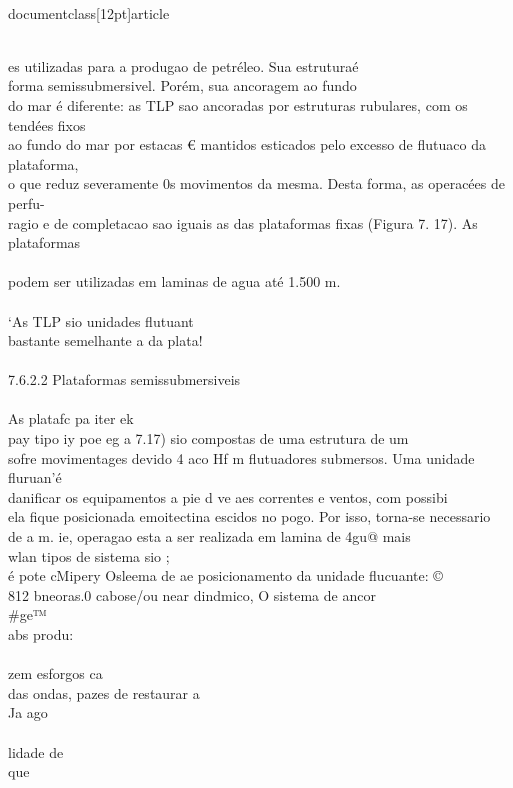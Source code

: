 \\documentclass[12pt]{article}
\begin{document}
\\
es utilizadas para a produgao de petréleo. Sua estruturaé\\
forma semissubmersivel. Porém, sua ancoragem ao fundo\\
do mar é diferente: as TLP sao ancoradas por estruturas rubulares, com os tendées fixos\\
ao fundo do mar por estacas € mantidos esticados pelo excesso de flutuaco da plataforma,\\
o que reduz severamente 0s movimentos da mesma. Desta forma, as operacées de perfu-\\
ragio e de completacao sao iguais as das plataformas fixas (Figura 7. 17). As plataformas\\
\\
podem ser utilizadas em laminas de agua até 1.500 m.\\
\\
‘As TLP sio unidades flutuant\\
bastante semelhante a da plata!\\
\\
7.6.2.2 Plataformas semissubmersiveis\\
\\
As platafc pa iter ek\\
pay tipo iy poe eg a 7.17) sio compostas de uma estrutura de um\\
sofre movimentages devido 4 aco Hf m flutuadores submersos. Uma unidade fluruan'é\\
danificar os equipamentos a pie d ve aes correntes e ventos, com possibi\\
ela fique posicionada emoitectina escidos no pogo. Por isso, torna-se necessario\\
de a m. ie, operagao esta a ser realizada em lamina de 4gu@ mais\\
wlan tipos de sistema sio ;\\
é pote cMipery Osleema de ae posicionamento da unidade flucuante: ©\\
812 bneoras.0 cabose/ou near dindmico, O sistema de ancor\\#ge™\\
abs produ:\\
\\
zem esforgos ca\\
das ondas, pazes de restaurar a\\
Ja ago\\
\\
lidade de\\
que\\
\end{document}
